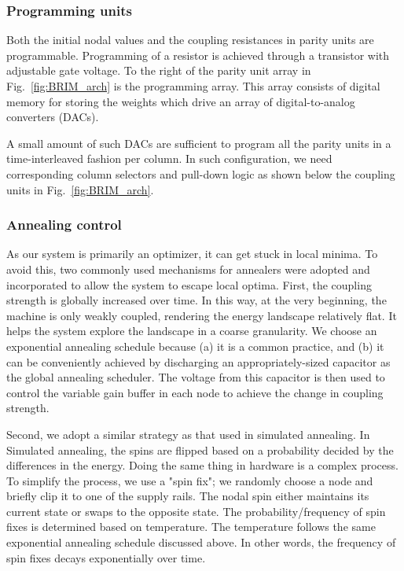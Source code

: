 \subsubsection{\bf Programming units}
Both the initial nodal values and the coupling resistances in parity units are programmable.
Programming of a resistor is achieved through a transistor with adjustable 
gate voltage.
To the right of the parity unit array in 
Fig.~\ref{fig:BRIM_arch} is the programming array. This array consists of 
digital memory for storing the weights which drive an array of digital-to-analog 
converters (DACs).

A small amount of such DACs are sufficient to program all the parity units in a time-interleaved fashion per column. In such configuration, 
we need corresponding column selectors and pull-down logic as shown below 
the coupling units in Fig.~\ref{fig:BRIM_arch}.

\subsubsection{\bf Annealing control}\label{ssec:anneal_control}

As our system is primarily an optimizer, it can get stuck in local minima. To avoid this, two commonly used mechanisms for annealers were adopted and incorporated to allow the system to escape local optima. First, the coupling strength is globally increased over time. In this way, at the very beginning, the machine is only weakly coupled, rendering the energy landscape relatively flat. It helps the system explore the landscape in a coarse granularity. We choose an exponential annealing schedule because (a) it is a common practice, and (b) it can be conveniently achieved by discharging an appropriately-sized capacitor as the global annealing scheduler. The voltage from this capacitor is then used to control the variable gain buffer in each node to achieve the change in coupling strength.

Second, we adopt a similar strategy as that used in simulated annealing. In Simulated annealing, the spins are flipped based on a probability decided by the differences in the energy. Doing the same thing in hardware is a complex process. To simplify the process, we use a "spin fix"; we randomly choose a node and briefly clip it to one of the supply rails. The nodal spin either maintains its current state or swaps to the opposite state. The probability/frequency of spin fixes is determined based on temperature. The temperature follows the same exponential annealing schedule discussed above. In other words, the frequency of spin fixes decays exponentially over time.

